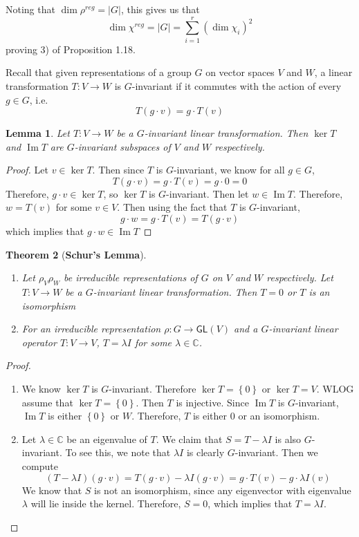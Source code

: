\documentclass[psamsfonts]{amsart}
\newtheorem{thm}{Theorem}[section]
\newtheorem{lem}[thm]{Lemma}
\theoremstyle{definition}
\theoremstyle{remark}
\newcommand{\C}{\mathbb{C}}
\newcommand{\GL}{\mathsf{GL}}
\newcommand{\set}[1]{\left\lbrace#1 \right\rbrace}
\newcommand{\abs}[1]{\left\lvert#1\right\rvert}
\DeclareMathOperator{\im}{Im}
\begin{document}
Noting that $\dim \rho^{reg} = \abs{G}$, this gives us that 
$$\dim \chi^{reg} = \abs{G} = \sum_{i=1}^r (\dim \chi_i)^2 $$
proving 3) of Proposition 1.18.

Recall that given representations of a group $G$ on vector spaces $V$ and $W$, a linear transformation $T: V \to W$ is $G$-invariant if it commutes with the action of every $g \in G$, i.e.
$$T(g \cdot v) = g \cdot T(v) $$

\begin{lem}
Let $T: V \to W$ be a $G$-invariant linear transformation. Then $\ker T$ and $\im T$ are $G$-invariant subspaces of $V$ and $W$ respectively.
\end{lem}

\begin{proof}
Let $v \in \ker T$. Then since $T$ is $G$-invariant, we know for all $g \in G$,
$$T(g \cdot v) = g \cdot T(v) = g\cdot 0 = 0 $$
Therefore, $g \cdot v \in \ker T$, so $\ker T$ is $G$-invariant. Then let $w \in \im T$. Therefore, $w = T(v)$ for some $v \in V$. Then using the fact that $T$ is $G$-invariant,
$$g \cdot w = g \cdot T(v) = T(g \cdot v) $$
which implies that $g \cdot w \in \im T$
\end{proof}

\begin{thm}[\textbf{Schur's Lemma}]\ \\ \vspace{-\baselineskip}
\begin{enumerate}
\item Let $\rho_V \rho_W$ be irreducible representations of $G$ on $V$ and $W$ respectively. Let $T: V \to W$ be a $G$-invariant linear transformation. Then $T = 0$ or $T$ is an isomorphism
\item For an irreducible representation $\rho: G \to \GL(V)$ and a $G$-invariant linear operator $T: V \to V$, $T = \lambda I$ for some $\lambda \in \C$.
\end{enumerate}
\end{thm}

\begin{proof}\ \\ \vspace{-\baselineskip}
\begin{enumerate}
\item We know $\ker T$ is $G$-invariant. Therefore $\ker T = \set{0}$ or $\ker T = V$. WLOG assume that $\ker T = \set{0}$. Then $T$ is injective. Since $\im T$ is $G$-invariant, $\im T$ is either $\set{0}$ or $W$. Therefore, $T$ is either $0$ or an isomorphism.
\item Let $\lambda \in \C$ be an eigenvalue of $T$. We claim that $S = T - \lambda I$ is also $G$-invariant. To see this, we note that $\lambda I$ is clearly $G$-invariant. Then we compute
$$(T - \lambda I)(g \cdot v) = T(g \cdot v) - \lambda I(g \cdot v) = g \cdot T(v) - g \cdot \lambda I (v) $$
We know that $S$ is not an isomorphism, since any eigenvector with eigenvalue $\lambda$ will lie inside the kernel. Therefore, $S = 0$, which implies that $T = \lambda I$.
\end{enumerate}
\end{proof}
\end{document}
